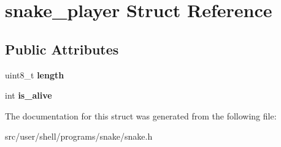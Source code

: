 \hypertarget{structsnake__player}{}\section{snake\+\_\+player Struct Reference}
\label{structsnake__player}
\subsection*{Public Attributes}
\begin{DoxyCompactItemize}
\item 
\mbox{\label{structsnake__player_a6dd233a59dfcbdf30e33e5aefc445a24}} 
uint8\+\_\+t {\bfseries length}
\item 
\mbox{\label{structsnake__player_a1e5b768ab2bdc57aad6d55ac590c8943}} 
int {\bfseries is\+\_\+alive}
\end{DoxyCompactItemize}


The documentation for this struct was generated from the following file\+:\begin{DoxyCompactItemize}
\item 
src/user/shell/programs/snake/snake.\+h\end{DoxyCompactItemize}

